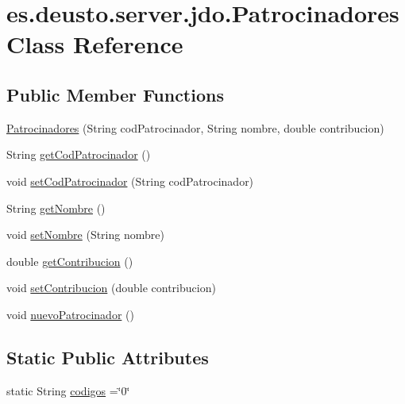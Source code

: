 \hypertarget{classes_1_1deusto_1_1server_1_1jdo_1_1_patrocinadores}{}\section{es.\+deusto.\+server.\+jdo.\+Patrocinadores Class Reference}
\label{classes_1_1deusto_1_1server_1_1jdo_1_1_patrocinadores}
\subsection*{Public Member Functions}
\begin{DoxyCompactItemize}
\item 
\mbox{\hyperlink{classes_1_1deusto_1_1server_1_1jdo_1_1_patrocinadores_a7e84637c5aad6a3fce05f9707261a1a8}{Patrocinadores}} (String cod\+Patrocinador, String nombre, double contribucion)
\item 
String \mbox{\hyperlink{classes_1_1deusto_1_1server_1_1jdo_1_1_patrocinadores_a8eb8dbed078066e785bbcae2dc4a2097}{get\+Cod\+Patrocinador}} ()
\item 
void \mbox{\hyperlink{classes_1_1deusto_1_1server_1_1jdo_1_1_patrocinadores_a0b14ac2e577e95083a4e05a6ffc6146e}{set\+Cod\+Patrocinador}} (String cod\+Patrocinador)
\item 
String \mbox{\hyperlink{classes_1_1deusto_1_1server_1_1jdo_1_1_patrocinadores_a22f45753d943a74eedecc6663ed73295}{get\+Nombre}} ()
\item 
void \mbox{\hyperlink{classes_1_1deusto_1_1server_1_1jdo_1_1_patrocinadores_ab972f72eef2fe2259d4c70be486184f3}{set\+Nombre}} (String nombre)
\item 
double \mbox{\hyperlink{classes_1_1deusto_1_1server_1_1jdo_1_1_patrocinadores_a7f7c99720f20dcbfbec1b31babe7c59f}{get\+Contribucion}} ()
\item 
void \mbox{\hyperlink{classes_1_1deusto_1_1server_1_1jdo_1_1_patrocinadores_aaf73e94951085646b7373e2a76a7667c}{set\+Contribucion}} (double contribucion)
\item 
void \mbox{\hyperlink{classes_1_1deusto_1_1server_1_1jdo_1_1_patrocinadores_a845d3ce142a8f56375cfafdcc3139807}{nuevo\+Patrocinador}} ()
\end{DoxyCompactItemize}
\subsection*{Static Public Attributes}
\begin{DoxyCompactItemize}
\item 
static String \mbox{\hyperlink{classes_1_1deusto_1_1server_1_1jdo_1_1_patrocinadores_adb6dca7e8098d65faf18f5e071127acc}{codigos}} =\char`\"{}0\char`\"{}
\end{DoxyCompactItemize}


